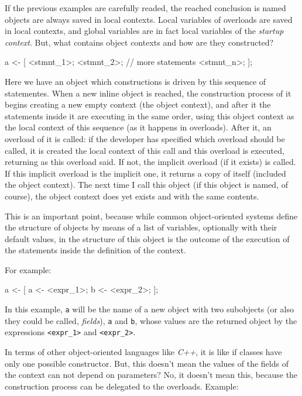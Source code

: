 \documentclass{article}
\begin{document}
If the previous examples are carefully readed, the reached conclusion is named
objects are always saved in local contexts. Local variables of overloads are
saved in local contexts, and global variables are in fact local variables of the
\textit{startup context}. But, what contains object contexts and how are they
constructed?

\begin{faupp2}
 a <- [
         <stmnt_1>;
         <stmnt_2>;
         // more statements
         <stmnt_n>;
      ];
\end{faupp2}

Here we have an object which constructions is driven by this sequence of
statementes. When a new inline object is reached, the construction process of it
begins creating a new empty context (the object context), and after it the
statements inside it are executing in the same order, using this object context
as the local context of this sequence (as it happens in overloads). After it,
an overload of it is called: if the developer has specified which overload
should be called, it is created the local context of this call and this overload
is executed, returning as this overload said. If not, the implicit overload (if
it exists) is called. If this implicit overload is the implicit one, it returns
a copy of itself (included the object context). The next time I call this object
(if this object is named, of course), the object context does yet exists and
with the same contents.

This is an important point, because while common object-oriented systems
define the structure of objects by means of a list of variables, optionally with
their default values, in \faupp the structure of this object is the outcome of
the execution of the statements inside the definition of the context.

For example:

\begin{faupp2}
  a <- [
          a <- <expr_1>;
          b <- <expr_2>;
       ];
\end{faupp2}

In this example, \texttt{a} will be the name of a new object with two subobjects
(or also they could be called, \textit{fields}), \texttt{a} and \texttt{b}, whose
values are the returned object by the expressions \texttt{<expr\_1>} and
\texttt{<expr\_2>}.

In terms of other object-oriented languages like \textit{C++}, it is like if
classes have only one possible constructor. But, this doesn't mean the values of
the fields of the context can not depend on parameters? No, it doesn't mean
this, because the construction process can be delegated to the
overloads. Example:
\end{document}
